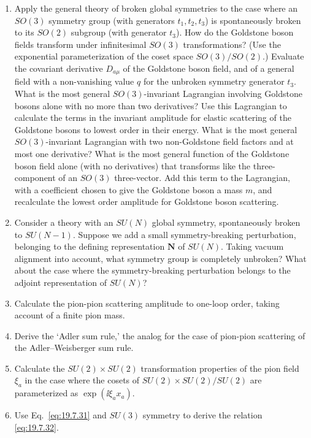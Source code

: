 

\begin{enumerate}
\item Apply the general theory of broken global symmetries to the case where an $SO(3)$ symmetry group (with generators $t_1,t_2,t_3$) is spontaneously broken to its $SO(2)$ subgroup (with generator $t_3$). How do the Goldstone boson fields transform under infinitesimal $SO(3)$ transformations? (Use the exponential parameterization of the coset space $SO(3)/SO(2)$.) Evaluate the covariant derivative $D_{a\mu}$ of the Goldstone boson field, and of a general field with a non-vanishing value $q$ for the unbroken symmetry generator $t_3$. What is the most general $SO(3)$-invariant Lagrangian involving Goldstone bosons alone with no more than two derivatives? Use this Lagrangian to calculate the terms in the invariant amplitude for elastic scattering of the Goldstone bosons to lowest order in their energy. What is the most general $SO(3)$-invariant Lagrangian with two non-Goldstone field factors and at most one derivative? What is the most general function of the Goldstone boson field alone (with no derivatives) that transforms like the three-component of an $SO(3)$ three-vector. Add this term to the Lagrangian, with a coefficient chosen to give the Goldstone boson a mass $m$, and recalculate the lowest order amplitude for Goldstone boson scattering.

\item Consider a theory with an $SU(N)$ global symmetry, spontaneously broken to $SU(N-1)$. Suppose we add a small symmetry-breaking perturbation, belonging to the defining representation $\mathbf N$ of $SU(N)$. Taking vacuum alignment into account, what symmetry group is completely unbroken? What about the case where the symmetry-breaking perturbation belongs to the adjoint representation of $SU(N)$?

\item Calculate the pion-pion scattering amplitude to one-loop order, taking account of a finite pion mass.

\item Derive the `Adler sum rule,' the analog for the case of pion-pion scattering of the Adler--Weisberger sum rule.

\item Calculate the $SU(2)\times SU(2)$ transformation properties of the pion field $\xi_a$ in the case where the cosets of $SU(2)\times SU(2)/SU(2)$ are parameterized as $\exp(\ii\xi_ax_a)$.

\item Use Eq.~\eqref{eq:19.7.31} and $SU(3)$ symmetry to derive the relation \eqref{eq:19.7.32}.
\end{enumerate}

